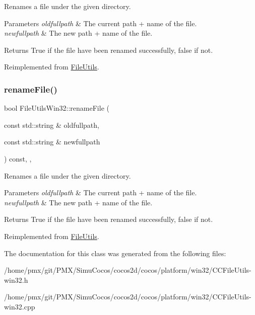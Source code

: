 Renames a file under the given directory.


\begin{DoxyParams}{Parameters}
{\em oldfullpath} & The current path + name of the file. \\
\hline
{\em newfullpath} & The new path + name of the file. \\
\hline
\end{DoxyParams}
\begin{DoxyReturn}{Returns}
True if the file have been renamed successfully, false if not. 
\end{DoxyReturn}


Reimplemented from \hyperlink{classFileUtils_a5a73b69c8322c48c3fbad2a262d354d8}{File\+Utils}.

\mbox{\label{classFileUtilsWin32_a1c948c39348ea2a7b88cc232b96e3f68}} 
\subsubsection{\texorpdfstring{rename\+File()}{renameFile()}\hspace{0.1cm}{\footnotesize\ttfamily [4/4]}}
{\footnotesize\ttfamily bool File\+Utils\+Win32\+::rename\+File (\begin{DoxyParamCaption}\item[{const std\+::string \&}]{oldfullpath,  }\item[{const std\+::string \&}]{newfullpath }\end{DoxyParamCaption}) const\hspace{0.3cm}{\ttfamily [override]}, {\ttfamily [protected]}, {\ttfamily [virtual]}}

Renames a file under the given directory.


\begin{DoxyParams}{Parameters}
{\em oldfullpath} & The current path + name of the file. \\
\hline
{\em newfullpath} & The new path + name of the file. \\
\hline
\end{DoxyParams}
\begin{DoxyReturn}{Returns}
True if the file have been renamed successfully, false if not. 
\end{DoxyReturn}


Reimplemented from \hyperlink{classFileUtils_a3e68a89a46e1d78df898cbbe1776d75e}{File\+Utils}.



The documentation for this class was generated from the following files\+:\begin{DoxyCompactItemize}
\item 
/home/pmx/git/\+P\+M\+X/\+Simu\+Cocos/cocos2d/cocos/platform/win32/C\+C\+File\+Utils-\/win32.\+h\item 
/home/pmx/git/\+P\+M\+X/\+Simu\+Cocos/cocos2d/cocos/platform/win32/C\+C\+File\+Utils-\/win32.\+cpp\end{DoxyCompactItemize}
